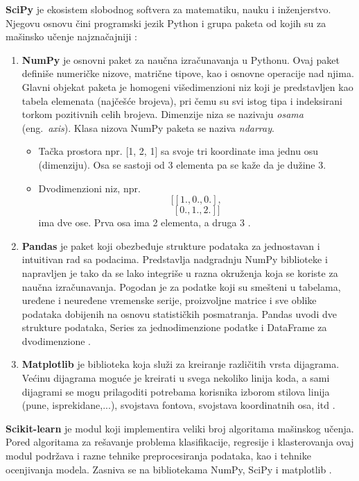 \documentclass[12pt,oneside]{memoir}
\begin{document}
\textbf{SciPy} je ekosistem slobodnog softvera za matematiku, nauku i inženjerstvo. Njegovu osnovu čini programski jezik Python i grupa paketa od kojih su za mašinsko učenje najznačajniji \cite{scipy}:
\begin{enumerate}[1)]
\item \textbf{NumPy} je osnovni paket za naučna izračunavanja u Pythonu. Ovaj paket definiše numeričke nizove, matrične tipove, kao i osnovne operacije nad njima.  %
Glavni objekat paketa je homogeni višedimenzioni niz koji je predstavljen kao tabela elemenata (najčešće brojeva), pri čemu su svi istog tipa i indeksirani torkom pozitivnih celih brojeva. Dimenzije niza se nazivaju \textit{osama} (eng.~\textit{axis}). Klasa nizova NumPy paketa se naziva \textit{ndarray}.
\begin{itemize}
\item Tačka prostora npr. [1, 2, 1] sa svoje tri koordinate ima jednu osu (dimenziju). Osa se sastoji od 3 elementa pa se kaže da je dužine 3. 
\item Dvodimenzioni niz, npr.
$$[[ 1., 0., 0.],$$ 
$$ [ 0., 1., 2.]] $$
 ima dve ose. Prva osa ima 2 elementa, a druga 3 \cite{scipy, scipy-quickstart}. 
\end{itemize}
\item \textbf{Pandas}  %
je paket koji obezbeđuje strukture podataka za jednostavan i intuitivan rad sa podacima. Predstavlja nadgradnju NumPy biblioteke i napravljen je tako da se lako integriše u razna okruženja koja se koriste za naučna izračunavanja. Pogodan je za podatke koji su smešteni u tabelama, uređene i neuređene vremenske serije, proizvoljne matrice i sve oblike podataka dobijenih na osnovu statističkih posmatranja. Pandas uvodi dve strukture podataka, Series za jednodimenzione podatke i DataFrame za dvodimenzione \cite{pandas}. 
\item \textbf{Matplotlib}  %
je biblioteka koja služi za kreiranje različitih vrsta dijagrama. Većinu dijagrama moguće je kreirati u svega nekoliko linija koda, a sami dijagrami se mogu prilagoditi potrebama korisnika izborom stilova linija (pune, isprekidane,...), svojstava fontova, svojstava koordinatnih osa, itd \cite{matplotlib}.
\end{enumerate}

\textbf{Scikit-learn}  %
je modul koji implementira veliki broj algoritama mašinskog učenja. Pored algoritama za rešavanje problema klasifikacije, regresije i klasterovanja ovaj modul podržava i razne tehnike preprocesiranja podataka, kao i tehnike ocenjivanja modela. Zasniva se na bibliotekama NumPy, SciPy i matplotlib \cite{scikit-learn}.
\end{document}
